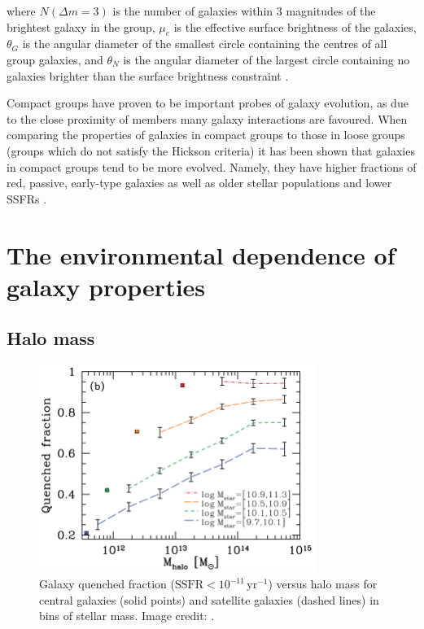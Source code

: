 \noindent
where $N(\Delta m = 3)$ is the number of galaxies within 3 magnitudes
of the brightest galaxy in the group, $\mu_e$ is the effective surface
brightness of the galaxies, $\theta_G$ is the angular diameter of the
smallest circle containing the centres of all group galaxies, and
$\theta_N$ is the angular diameter of the largest circle containing no
galaxies brighter than the surface brightness constraint
\citep{hickson1982, mcconnachie2009}.
\par
Compact groups have proven to be important probes of galaxy evolution,
as due to the close proximity of members many galaxy interactions are
favoured.  When comparing the properties of galaxies in compact groups
to those in loose groups (groups which do not satisfy the Hickson
criteria) it has been shown that galaxies in compact groups tend to be
more evolved.  Namely, they have higher fractions of red, passive,
early-type galaxies as well as older stellar populations and lower
SSFRs \citep{coenda2012, coenda2015}.

\section{The environmental dependence of galaxy properties}
\label{sec:enviro_dependence}

\subsection{Halo mass}
\label{sec:halo_mass}

\begin{figure}
  \centering
  \includegraphics[width=0.8\textwidth]{quenchFrac_wetzel.png}
  \caption{Galaxy quenched fraction ($\mathrm{SSFR} <
    10^{-11}\,\mathrm{yr^{-1}}$) versus halo mass for central galaxies
    (solid points) and satellite galaxies (dashed lines) in bins of stellar mass.  Image credit: \citet{wetzel2012}.}
  \label{fig:quenchFrac_wetzel}
\end{figure}

